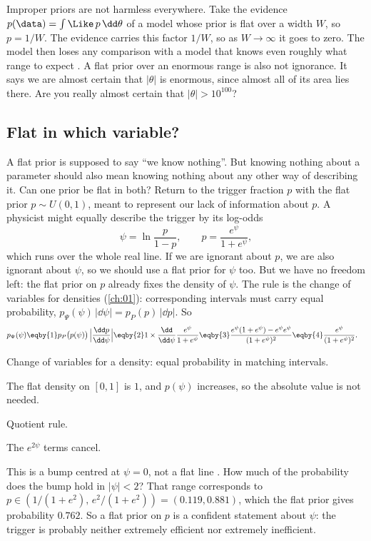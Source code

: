 Improper priors are not harmless everywhere. Take the evidence $p(\data)=\int\Like\,p\,
\dd\theta$ of a model whose prior is flat over a width $W$, so $p=1/W$. The evidence
carries this factor $1/W$, so as $W\to\infty$ it goes to zero. The model then loses any
comparison with a model that knows even roughly what range to expect
. A flat prior
over an enormous range is also not ignorance. It says we are almost certain that
$|\theta|$ is enormous, since almost all of its area lies there. Are you really almost
certain that $|\theta|>10^{100}$?

\subsection{Flat in which variable?}

A flat prior is supposed to say ``we know nothing''. But knowing nothing about a
parameter should also mean knowing nothing about any other way of describing it. Can
one prior be flat in both? Return to the trigger fraction $p$ with the flat prior
$p\sim U(0,1)$, meant to represent our lack of information about $p$. A physicist might
equally describe the trigger by its log-odds
\begin{equation*}
  \psi=\ln\frac{p}{1-p},\qquad p=\frac{e^\psi}{1+e^\psi},
\end{equation*}
which runs over the whole real line. If we are ignorant about $p$, we are also ignorant
about $\psi$, so we should use a flat prior for $\psi$ too. But we have no freedom left:
the flat prior on $p$ already fixes the density of $\psi$. The rule is the change of
variables for densities (\cref{ch:01}): corresponding intervals must carry equal
probability, $p_\Psi(\psi)\,|\dd\psi|=p_P(p)\,|\dd p|$. So
\begin{align}
  p_\Psi(\psi)
  &\eqby{1}p_P\bigl(p(\psi)\bigr)\,\Bigl|\frac{\dd p}{\dd\psi}\Bigr|
   \eqby{2}1\times\frac{\dd}{\dd\psi}\frac{e^\psi}{1+e^\psi}
   \eqby{3}\frac{e^\psi(1+e^\psi)-e^\psi e^\psi}{(1+e^\psi)^2}
   \eqby{4}\frac{e^\psi}{(1+e^\psi)^2} .
  \label{5b:eq:logit-density}
\end{align}
\begin{explain}
  \item Change of variables for a density: equal probability in matching intervals.
  \item The flat density on $[0,1]$ is $1$, and $p(\psi)$ increases, so the absolute
        value is not needed.
  \item Quotient rule.
  \item The $e^{2\psi}$ terms cancel.
\end{explain}
This is a bump centred at $\psi=0$, not a flat line . How much of the
probability does the bump hold in $|\psi|<2$? That range corresponds to
$p\in(1/(1+e^2),\,e^2/(1+e^2))=(0.119,0.881)$, which the flat prior gives probability
$0.762$. So a flat prior on $p$ is a confident statement about $\psi$: the trigger is
probably neither extremely efficient nor extremely inefficient.

